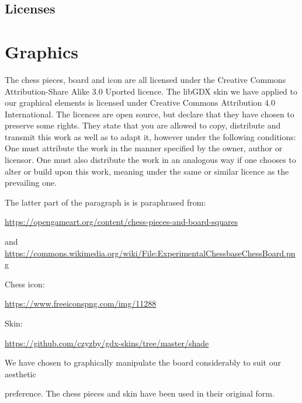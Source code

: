 \documentclass[a4paper, 11pt]{article}
\begin{document}
\noindent

\begin{center}
\section*{Licenses}
\end{center}
\vspace{10 mm}
\section*{Graphics}
The chess pieces, board and icon are all licensed under the Creative Commons Attribution-Share Alike 3.0 Uported licence.  The libGDX skin we have applied to our graphical elements is licensed under Creative Commons Attribution 4.0 International. The licences are open source, but declare that they have chosen to preserve some rights. They state that you are allowed to copy, distribute and transmit this work as well as to adapt it, however under the following conditions: One must attribute the work in the manner specified by the owner, author or licensor. One must also distribute the work in an analogous way if one chooses to alter or build upon this work, meaning under the same or similar licence as the prevailing one. 

\vspace{5 mm}
\noindent
The latter part of the paragraph is is paraphrased from:

\vspace{3 mm}
\noindent
\url{https://opengameart.org/content/chess-pieces-and-board-squares}

\vspace{3 mm}
\noindent
and \url{https://commons.wikimedia.org/wiki/File:ExperimentalChessbaseChessBoard.png }

\vspace{3 mm}
\noindent
Chess icon: 

\vspace{1mm}
\url{https://www.freeiconspng.com/img/11288}


\vspace{5 mm}
\noindent
Skin:

\url{https://github.com/czyzby/gdx-skins/tree/master/shade}

\vspace{10mm}
\noindent
We have chosen to graphically manipulate the board considerably to suit our aesthetic 

\noindent
preference. The chess pieces and skin have been used in their original form.
\end{document}
